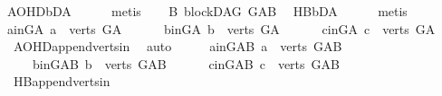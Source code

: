 \begin{isabellebody}
\ AOHD{\isachardot}{\kern0pt}bD{\isacharunderscore}{\kern0pt}A\isanewline
\ \ \ \ \isamarkupfalse%
\ metis\isanewline
\ \ \isamarkupfalse%
\ B{}{\isacharcolon}{\kern0pt}\ blockDAG\ {\isachardoublequoteopen}G{\isacharunderscore}{\kern0pt}AB{\isachardoublequoteclose}\ \isamarkupfalse%
\ HB{}{\isachardot}{\kern0pt}bD{\isacharunderscore}{\kern0pt}A\isanewline
\ \ \ \ \isamarkupfalse%
\ metis\isanewline
\ \ \isamarkupfalse%
\ a{\isacharunderscore}{\kern0pt}in{\isacharunderscore}{\kern0pt}G{\isacharunderscore}{\kern0pt}A{\isacharcolon}{\kern0pt}\ {\isachardoublequoteopen}a\ {\isasymin}\ verts\ G{\isacharunderscore}{\kern0pt}A{\isachardoublequoteclose}\ \isanewline
\ \ \ \ \ b{\isacharunderscore}{\kern0pt}in{\isacharunderscore}{\kern0pt}G{\isacharunderscore}{\kern0pt}A{\isacharcolon}{\kern0pt}\ {\isachardoublequoteopen}b\ {\isasymin}\ verts\ G{\isacharunderscore}{\kern0pt}A{\isachardoublequoteclose}\ \isanewline
\ \ \ \ \ c{\isacharunderscore}{\kern0pt}in{\isacharunderscore}{\kern0pt}G{\isacharunderscore}{\kern0pt}A{\isacharcolon}{\kern0pt}\ {\isachardoublequoteopen}c\ {\isasymin}\ verts\ G{\isacharunderscore}{\kern0pt}A{\isachardoublequoteclose}\ \isamarkupfalse%
\ {}{\isacharparenleft}{\kern0pt}{}{\isacharcomma}{\kern0pt}{}{\isacharcomma}{\kern0pt}{}{\isacharparenright}{\kern0pt}\ AOHD{\isachardot}{\kern0pt}append{\isacharunderscore}{\kern0pt}verts{\isacharunderscore}{\kern0pt}in\ \isamarkupfalse%
\ auto\isanewline
\ \ \isamarkupfalse%
\ \isamarkupfalse%
\ a{\isacharunderscore}{\kern0pt}in{\isacharunderscore}{\kern0pt}G{\isacharunderscore}{\kern0pt}AB{\isacharcolon}{\kern0pt}\ {\isachardoublequoteopen}a\ {\isasymin}\ verts\ G{\isacharunderscore}{\kern0pt}AB{\isachardoublequoteclose}\ \isanewline
\ \ \ \ \ b{\isacharunderscore}{\kern0pt}in{\isacharunderscore}{\kern0pt}G{\isacharunderscore}{\kern0pt}AB{\isacharcolon}{\kern0pt}\ {\isachardoublequoteopen}b\ {\isasymin}\ verts\ G{\isacharunderscore}{\kern0pt}AB{\isachardoublequoteclose}\ \isanewline
\ \ \ \ \ c{\isacharunderscore}{\kern0pt}in{\isacharunderscore}{\kern0pt}G{\isacharunderscore}{\kern0pt}AB{\isacharcolon}{\kern0pt}\ {\isachardoublequoteopen}c\ {\isasymin}\ verts\ G{\isacharunderscore}{\kern0pt}AB{\isachardoublequoteclose}\ \isamarkupfalse%
\ {}{\isacharparenleft}{\kern0pt}{}{\isacharcomma}{\kern0pt}{}{\isacharcomma}{\kern0pt}{}{\isacharparenright}{\kern0pt}\ HB{}{\isachardot}{\kern0pt}append{\isacharunderscore}{\kern0pt}verts{\isacharunderscore}{\kern0pt}in\ \isamarkupfalse%

\end{isabellebody}
